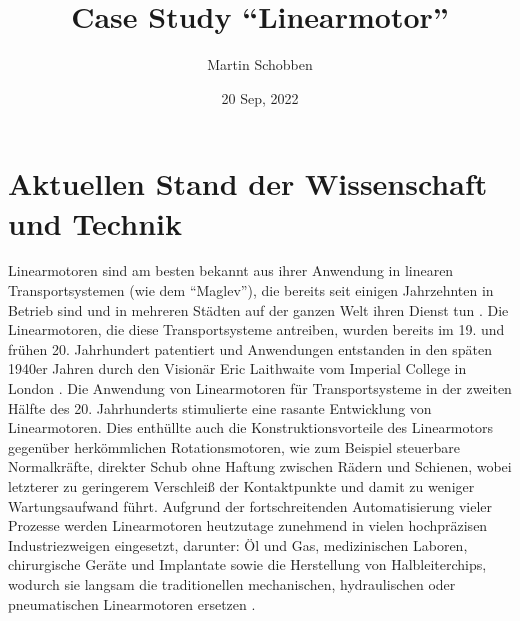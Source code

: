 \documentclass[
  oneside]{book}
\title{Case Study ``Linearmotor''}
\author{Martin Schobben}
\date{20 Sep, 2022}
\begin{document}
\maketitle

\hypertarget{section}{%
\section*{}\label{section}}

\hypertarget{aktuellen-stand-der-wissenschaft-und-technik}{%
\section{Aktuellen Stand der Wissenschaft und Technik}\label{aktuellen-stand-der-wissenschaft-und-technik}}

Linearmotoren sind am besten bekannt aus ihrer Anwendung in linearen Transportsystemen (wie dem ``Maglev''), die bereits seit einigen Jahrzehnten in Betrieb sind und in mehreren Städten auf der ganzen Welt ihren Dienst tun \citep{hellinger2009, palka2021}. Die Linearmotoren, die diese Transportsysteme antreiben, wurden bereits im 19. und frühen 20. Jahrhundert patentiert und Anwendungen entstanden in den späten 1940er Jahren durch den Visionär Eric Laithwaite vom Imperial College in London \citep{hellinger2009}. Die Anwendung von Linearmotoren für Transportsysteme in der zweiten Hälfte des 20. Jahrhunderts stimulierte eine rasante Entwicklung von Linearmotoren. Dies enthüllte auch die Konstruktionsvorteile des Linearmotors gegenüber herkömmlichen Rotationsmotoren, wie zum Beispiel steuerbare Normalkräfte, direkter Schub ohne Haftung zwischen Rädern und Schienen, wobei letzterer zu geringerem Verschleiß der Kontaktpunkte und damit zu weniger Wartungsaufwand führt. Aufgrund der fortschreitenden Automatisierung vieler Prozesse werden Linearmotoren heutzutage zunehmend in vielen hochpräzisen Industriezweigen eingesetzt, darunter: Öl und Gas, medizinischen Laboren, chirurgische Geräte und Implantate sowie die Herstellung von Halbleiterchips, wodurch sie langsam die traditionellen mechanischen, hydraulischen oder pneumatischen Linearmotoren ersetzen \citep{gieras2018}.
\end{document}
